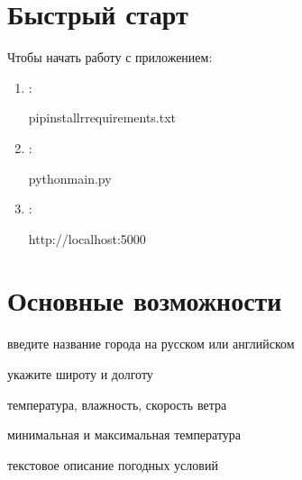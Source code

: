\documentclass[letterpaper,10pt,russian]{sphinxmanual}
\begin{document}
\chapter{Быстрый старт}
\label{\detokenize{index:id1}}
\sphinxAtStartPar
Чтобы начать работу с приложением:
\begin{enumerate}
%
\item {} 
\sphinxAtStartPar
{}:

\begin{sphinxVerbatim}[commandchars=\\\{\}]
pipinstall\PYGZhy{}rrequirements.txt
\end{sphinxVerbatim}

\item {} 
\sphinxAtStartPar
{}:

\begin{sphinxVerbatim}[commandchars=\\\{\}]
pythonmain.py
\end{sphinxVerbatim}

\item {} 
\sphinxAtStartPar
{}:

\begin{sphinxVerbatim}[commandchars=\\\{\}]
http://localhost:5000
\end{sphinxVerbatim}

\end{enumerate}


\chapter{Основные возможности}
\label{\detokenize{index:id2}}
\sphinxAtStartPar
{} \sphinxhyphen{} введите название города на русском или английском

\sphinxAtStartPar
{} \sphinxhyphen{} укажите широту и долготу

\sphinxAtStartPar
{} \sphinxhyphen{} температура, влажность, скорость ветра

\sphinxAtStartPar
{} \sphinxhyphen{} минимальная и максимальная температура

\sphinxAtStartPar
{} \sphinxhyphen{} текстовое описание погодных условий
\end{document}

